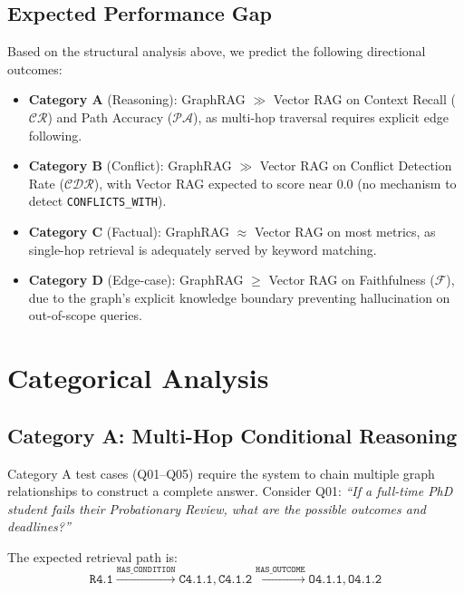 \subsection{Expected Performance Gap}

Based on the structural analysis above, we predict the following directional outcomes:

\begin{itemize}
    \item \textbf{Category A} (Reasoning): GraphRAG $\gg$ Vector RAG on Context Recall ($\mathcal{CR}$) and Path Accuracy ($\mathcal{PA}$), as multi-hop traversal requires explicit edge following.
    \item \textbf{Category B} (Conflict): GraphRAG $\gg$ Vector RAG on Conflict Detection Rate ($\mathcal{CDR}$), with Vector RAG expected to score near 0.0 (no mechanism to detect \texttt{CONFLICTS\_WITH}).
    \item \textbf{Category C} (Factual): GraphRAG $\approx$ Vector RAG on most metrics, as single-hop retrieval is adequately served by keyword matching.
    \item \textbf{Category D} (Edge-case): GraphRAG $\geq$ Vector RAG on Faithfulness ($\mathcal{F}$), due to the graph's explicit knowledge boundary preventing hallucination on out-of-scope queries.
\end{itemize}


\section{Categorical Analysis}
\label{sec:analysis}

\subsection{Category A: Multi-Hop Conditional Reasoning}

Category A test cases (Q01--Q05) require the system to chain multiple graph relationships to construct a complete answer. Consider Q01: \textit{``If a full-time PhD student fails their Probationary Review, what are the possible outcomes and deadlines?''}

The expected retrieval path is:
\begin{equation*}
    \texttt{R4.1} \xrightarrow{\texttt{HAS\_CONDITION}} \texttt{C4.1.1}, \texttt{C4.1.2} \xrightarrow{\texttt{HAS\_OUTCOME}} \texttt{O4.1.1}, \texttt{O4.1.2}
\end{equation*}

